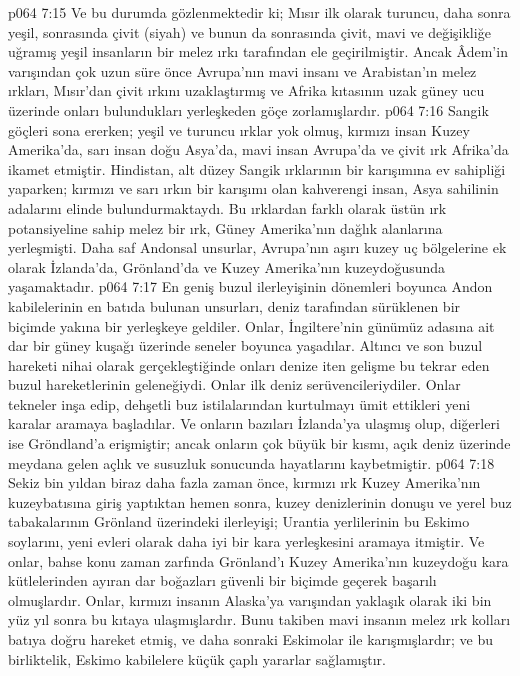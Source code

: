 \vs p064 7:15 Ve bu durumda gözlenmektedir ki; Mısır ilk olarak turuncu, daha sonra yeşil, sonrasında çivit (siyah) ve bunun da sonrasında çivit, mavi ve değişikliğe uğramış yeşil insanların bir melez ırkı tarafından ele geçirilmiştir. Ancak Âdem’in varışından çok uzun süre önce Avrupa’nın mavi insanı ve Arabistan’ın melez ırkları, Mısır’dan çivit ırkını uzaklaştırmış ve Afrika kıtasının uzak güney ucu üzerinde onları bulundukları yerleşkeden göçe zorlamışlardır.
\vs p064 7:16 Sangik göçleri sona ererken; yeşil ve turuncu ırklar yok olmuş, kırmızı insan Kuzey Amerika’da, sarı insan doğu Asya’da, mavi insan Avrupa’da ve çivit ırk Afrika’da ikamet etmiştir. Hindistan, alt düzey Sangik ırklarının bir karışımına ev sahipliği yaparken; kırmızı ve sarı ırkın bir karışımı olan kahverengi insan, Asya sahilinin adalarını elinde bulundurmaktaydı. Bu ırklardan farklı olarak üstün ırk potansiyeline sahip melez bir ırk, Güney Amerika’nın dağlık alanlarına yerleşmişti. Daha saf Andonsal unsurlar, Avrupa’nın aşırı kuzey uç bölgelerine ek olarak İzlanda’da, Grönland'da ve Kuzey Amerika’nın kuzeydoğusunda yaşamaktadır.
\vs p064 7:17 En geniş buzul ilerleyişinin dönemleri boyunca Andon kabilelerinin en batıda bulunan unsurları, deniz tarafından sürüklenen bir biçimde yakına bir yerleşkeye geldiler. Onlar, İngiltere’nin günümüz adasına ait dar bir güney kuşağı üzerinde seneler boyunca yaşadılar. Altıncı ve son buzul hareketi nihai olarak gerçekleştiğinde onları denize iten gelişme bu tekrar eden buzul hareketlerinin geleneğiydi. Onlar ilk deniz serüvencileriydiler. Onlar tekneler inşa edip, dehşetli buz istilalarından kurtulmayı ümit ettikleri yeni karalar aramaya başladılar. Ve onların bazıları İzlanda’ya ulaşmış olup, diğerleri ise Gröndland’a erişmiştir; ancak onların çok büyük bir kısmı, açık deniz üzerinde meydana gelen açlık ve susuzluk sonucunda hayatlarını kaybetmiştir.
\vs p064 7:18 Sekiz bin yıldan biraz daha fazla zaman önce, kırmızı ırk Kuzey Amerika’nın kuzeybatısına giriş yaptıktan hemen sonra, kuzey denizlerinin donuşu ve yerel buz tabakalarının Grönland üzerindeki ilerleyişi; Urantia yerlilerinin bu Eskimo soylarını, yeni evleri olarak daha iyi bir kara yerleşkesini aramaya itmiştir. Ve onlar, bahse konu zaman zarfında Grönland’ı Kuzey Amerika’nın kuzeydoğu kara kütlelerinden ayıran dar boğazları güvenli bir biçimde geçerek başarılı olmuşlardır. Onlar, kırmızı insanın Alaska’ya varışından yaklaşık olarak iki bin yüz yıl sonra bu kıtaya ulaşmışlardır. Bunu takiben mavi insanın melez ırk kolları batıya doğru hareket etmiş, ve daha sonraki Eskimolar ile karışmışlardır; ve bu birliktelik, Eskimo kabilelere küçük çaplı yararlar sağlamıştır.
